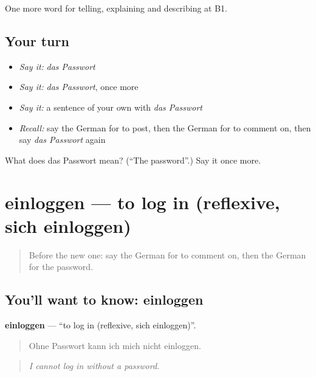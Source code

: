 \begin{grammarlens}[title={What you've built}]
One more word for telling, explaining and describing at B1.
\end{grammarlens}

\subsection*{Your turn}
\begin{itemize}
\raggedright
  \item \emph{Say it:} \emph{das Passwort}
  \item \emph{Say it:} \emph{das Passwort}, once more
  \item \emph{Say it:} a sentence of your own with \emph{das Passwort}
  \item \emph{Recall:} say the German for to post, then the German for to comment on, then say \emph{das Passwort} again
\end{itemize}

\begin{tcolorbox}[breakable,colback=teal!4,colframe=teal!35!black,title={Before you move on}]
What does das Passwort mean? (\textquotedblleft{}The password\textquotedblright{}.) Say it once more.
\end{tcolorbox}
\section[einloggen]{einloggen — to log in (reflexive, sich einloggen)}

\label{lesson:GE-C395-einloggen}



\begin{quote}
Before the new one: say the German for to comment on, then the German for the password.
\end{quote}

\subsection*{You'll want to know: einloggen}
\textbf{einloggen} — \textquotedblleft{}to log in (reflexive, sich einloggen)\textquotedblright{}.

\begin{quote}
Ohne Passwort kann ich mich nicht einloggen.
\end{quote}

\begin{quote}
\emph{I cannot log in without a password.}
\end{quote}

